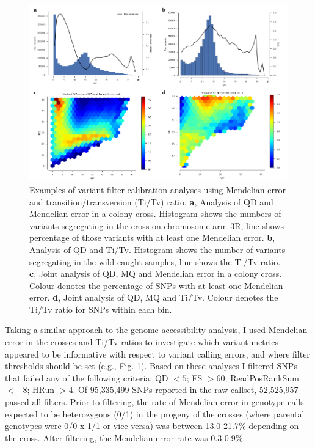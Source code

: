 \documentclass[a4paper,11pt,abstracton,hidelinks]{scrartcl}
\begin{document}
\begin{figure}[t!]
\centering
\includegraphics[width=1.1\textwidth,center]{artwork/chapter3/variant_filtering.pdf}
\caption{Examples of variant filter calibration analyses using Mendelian error and transition/transversion (Ti/Tv) ratio.
%
\textbf{a}, Analysis of QD and Mendelian error in a colony cross. Histogram shows the numbers of variants segregating in the cross on chromosome arm 3R, line shows percentage of those variants with at least one Mendelian error.
%
\textbf{b}, Analysis of QD and Ti/Tv. Histogram shows the number of variants segregating in the wild-caught samples, line shows the Ti/Tv ratio.
%
\textbf{c}, Joint analysis of QD, MQ and Mendelian error in a colony cross. Colour denotes the percentage of SNPs with at least one Mendelian error.
%
\textbf{d}, Joint analysis of QD, MQ and Ti/Tv. Colour denotes the Ti/Tv ratio for SNPs within each bin.
}
%
\label{fig:variant_filters}
\end{figure}


Taking a similar approach to the genome accessibility analysis, I used Mendelian error in the crosses and Ti/Tv ratios to investigate which variant metrics appeared to be informative with respect to variant calling errors, and where filter thresholds should be set (e.g., Fig. \ref{fig:variant_filters}).
%
Based on these analyses I filtered SNPs that failed any of the following criteria: QD $< 5$; FS $> 60$; ReadPosRankSum $< -8$; HRun $> 4$.
%
Of 95,335,499 SNPs reported in the raw callset, 52,525,957 passed all filters.
%
Prior to filtering, the rate of Mendelian error in genotype calls expected to be heterozygous (0/1) in the progeny of the crosses (where parental genotypes were 0/0 x 1/1 or vice versa) was between 13.0-21.7\% depending on the cross.
%
After filtering, the Mendelian error rate was 0.3-0.9\%.
\end{document}
